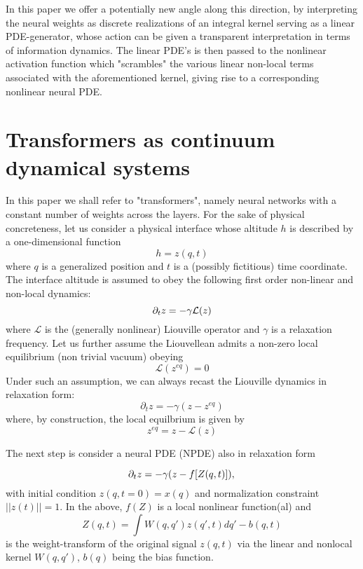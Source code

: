 \documentclass[15pt]{article}
\begin{document}
In this paper we offer a potentially new angle along this direction,
by interpreting the neural weights as discrete realizations
of an integral kernel serving as a linear PDE-generator, whose 
action can be given a transparent interpretation in terms of 
information dynamics.
The linear PDE's is then passed to the nonlinear activation function which "scrambles" the 
various linear non-local terms associated with the aforementioned kernel, giving
rise to a corresponding nonlinear neural PDE.


\section{Transformers as continuum dynamical systems}

In this paper we shall refer to "transformers", namely neural networks with
a constant number of weights across the layers.
For the sake of physical concreteness, let us consider a physical interface 
whose altitude $h$ is described by a one-dimensional function
\begin{equation}
h = z(q,t)
\end{equation}
where $q$ is a generalized position and $t$ is a (possibly fictitious)
time coordinate.
The interface altitude is assumed to obey the following 
first order non-linear and non-local dynamics:
\begin{equation}
\label{LIU}
\partial_t z = -\gamma \mathcal{L}(z)\\
\end{equation}
where $\mathcal{L}$ is the (generally nonlinear) Liouville operator
and $\gamma$ is a relaxation frequency.
Let us further assume the Liouvellean admits a non-zero local equilibrium
(non trivial vacuum) obeying 
$$
\mathcal{L}(z^{eq}) = 0
$$
Under such an assumption, we can always recast the Liouville
dynamics in relaxation form:
\begin{equation}
\label{RELAX}
\partial_t z = -\gamma (z-z^{eq})
\end{equation}
where, by construction, the local equilbrium is given by
\begin{equation}
\label{LEQ}
z^{eq}=z -\mathcal{L}(z)
\end{equation}

The next step is consider a neural PDE (NPDE) also in relaxation form

\begin{equation}
\label{NEU}
\partial_t z = -\gamma (z-f[Z(q,t)]),\\
\end{equation}
with initial condition $z(q,t=0)=x(q)$ and normalization 
constraint $||z(t)||=1$.
In the above, $f(Z)$ is a local nonlinear function(al) and 
\begin{equation}
\label{ZETA}
Z(q,t) = \int W(q,q') z(q',t) dq'-b(q,t)
\end{equation}
is the weight-transform of the original signal $z(q,t)$ via
the linear and nonlocal kernel $W(q,q')$, $b(q)$ 
being the bias function.
\end{document}
